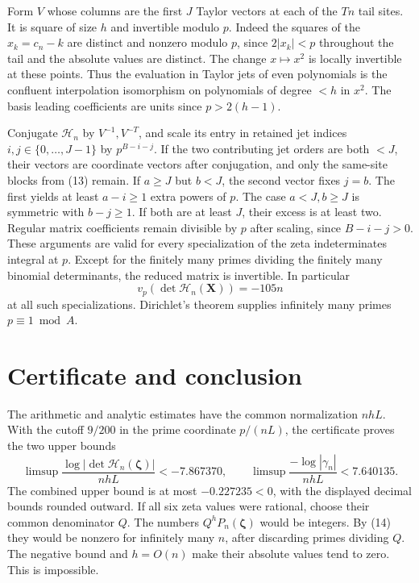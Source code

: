 \IfFileExists{TS1cmr.fd}{\documentclass[11pt]{article}}
\newcommand{\gateExp}{105}
\newcommand{\finalR}{-7.867370}
\newcommand{\finalC}{7.640135}
\newcommand{\finalNet}{-0.227235}
\newcommand{\cutoff}{9/200}
\begin{document}
Form \(V\) whose columns are the first \(J\) Taylor vectors at
each of the \(Tn\) tail sites. It is square of size \(h\) and
invertible modulo \(p\). Indeed the squares of the \(x_k=c_n-k\)
are distinct and nonzero modulo \(p\), since \(2|x_k|<p\)
throughout the tail and the absolute values are distinct.
The change \(x\mapsto x^2\) is locally invertible at these
points. Thus the evaluation in Taylor jets of even polynomials
is the confluent interpolation isomorphism on polynomials of
degree \(<h\) in \(x^2\). The basis leading coefficients are
units since \(p>2(h-1)\).

Conjugate \(\mathcal H_n\) by \(V^{-1},V^{-T}\), and scale its
entry in retained jet indices \(i,j\in\{0,\ldots,J-1\}\) by
\(p^{B-i-j}\).
If the two contributing jet orders are both \(<J\), their
vectors are coordinate vectors after conjugation, and only
the same-site blocks from (13) remain. If \(a\ge J\) but \(b<J\),
the second vector fixes \(j=b\). The first yields at least
\(a-i\ge1\) extra powers of \(p\). The case \(a<J,b\ge J\) is
symmetric with \(b-j\ge1\). If both are at least \(J\),
their excess is at least two. Regular matrix coefficients
remain divisible by \(p\) after scaling, since \(B-i-j>0\).
These arguments are valid for every specialization of the
zeta indeterminates integral at \(p\). Except for the finitely
many primes dividing the finitely many binomial determinants,
the reduced matrix is invertible. In particular
\[
 v_p(\det\mathcal H_n(\mathbf X))=-\gateExp n
 \tag{14}
\]
at all such specializations. Dirichlet's theorem supplies
infinitely many primes \(p\equiv1\bmod A\).

\section{Certificate and conclusion}
The arithmetic and analytic estimates have the common
normalization \(nhL\). With the cutoff \(\cutoff\) in the
prime coordinate \(p/(nL)\), the certificate proves the
two upper bounds
\[
 \limsup\frac{\log|\det\mathcal H_n(\boldsymbol\zeta)|}{nhL}
       < \finalR,\qquad
 \limsup\frac{-\log|\gamma_n|}{nhL}<\finalC .
\]
The combined upper bound is at most \(\finalNet<0\), with
the displayed decimal bounds rounded outward.
If all six zeta values were rational, choose their common
denominator \(Q\). The numbers \(Q^hP_n(\boldsymbol\zeta)\)
would be integers. By (14) they would be nonzero for infinitely
many \(n\), after discarding primes dividing \(Q\). The
negative bound and \(h=O(n)\) make their absolute values
tend to zero. This is impossible.
\end{document}
